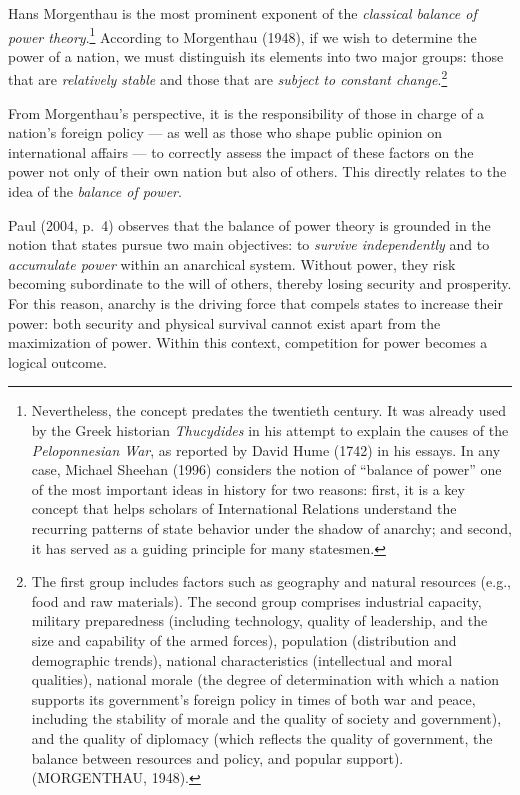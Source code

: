 Hans Morgenthau is the most prominent exponent of the \textit{classical balance of power theory}.\footnote{Nevertheless, the concept predates the twentieth century. It was already used by the Greek historian \textit{Thucydides} in his attempt to explain the causes of the \textit{Peloponnesian War}, as reported by David Hume (1742) in his essays. In any case, Michael Sheehan (1996) considers the notion of ``balance of power'' one of the most important ideas in history for two reasons: first, it is a key concept that helps scholars of International Relations understand the recurring patterns of state behavior under the shadow of anarchy; and second, it has served as a guiding principle for many statesmen.} According to Morgenthau (1948), if we wish to determine the power of a nation, we must distinguish its elements into two major groups: those that are \textit{relatively stable} and those that are \textit{subject to constant change}.\footnote{The first group includes factors such as geography and natural resources (e.g., food and raw materials). The second group comprises industrial capacity, military preparedness (including technology, quality of leadership, and the size and capability of the armed forces), population (distribution and demographic trends), national characteristics (intellectual and moral qualities), national morale (the degree of determination with which a nation supports its government’s foreign policy in times of both war and peace, including the stability of morale and the quality of society and government), and the quality of diplomacy (which reflects the quality of government, the balance between resources and policy, and popular support). (MORGENTHAU, 1948).} 

From Morgenthau’s perspective, it is the responsibility of those in charge of a nation’s foreign policy --- as well as those who shape public opinion on international affairs --- to correctly assess the impact of these factors on the power not only of their own nation but also of others. This directly relates to the idea of the \textit{balance of power}.

Paul (2004, p.~4) observes that the balance of power theory is grounded in the notion that states pursue two main objectives: to \textit{survive independently} and to \textit{accumulate power} within an anarchical system. Without power, they risk becoming subordinate to the will of others, thereby losing security and prosperity. For this reason, anarchy is the driving force that compels states to increase their power: both security and physical survival cannot exist apart from the maximization of power. Within this context, competition for power becomes a logical outcome.

